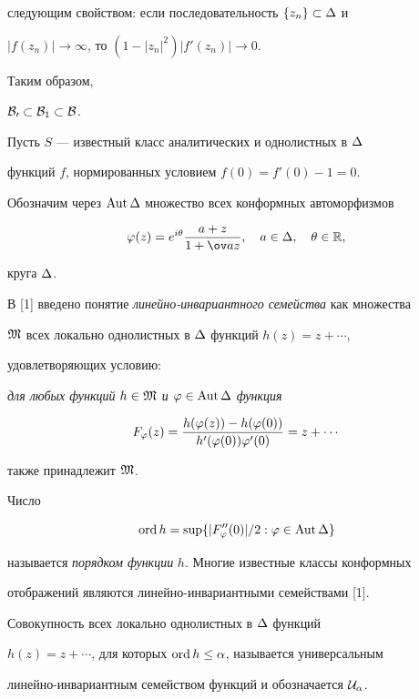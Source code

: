 следующим свойством: если последовательность $\{z_n\}\subset\Delta$ и


$|f(z_n)|\to\infty$, то $(1-|z_n|^2)|f'(z_n)|\to 0$.


Таким образом,


${\cal B_0}\subset{\cal B}_1\subset{\cal B}$.





Пусть $S$ --- известный класс аналитических и однолистных в $\Delta$


функций $f$, нормированных условием $f(0)=f'(0)-1=0$.


Обозначим через $\operatorname{Aut} \Delta$ множество всех конформных автоморфизмов


$$


\p(z)=e^{i\theta}\frac{a+z}{1+\ov az}, \quad a\in\De, \quad


\theta\in\Bbb R,


$$


круга $\Delta$.


В [1] введено понятие {\it линейно-инвариантного семейства} как множества


$\frak M$ всех локально однолистных в $\Delta$ функций $h(z)=z+\dotsb$,


удовлетворяющих условию:


{\it для любых функций $h\in\frak M$ и $\varphi\in \operatorname{Aut} \Delta$ функция


$$


F_\p (z)=\frac{h(\p (z))-h(\p (0))}{h'(\p (0))\p '(0)}


=z+\dotsb


$$


также принадлежит $\frak M$.}





Число


$$


\ord h =\sup\{{|F''_\p (0)|}/2 : \p\in \Aut \De\}


$$


называется {\it порядком функции} $h$. Многие известные классы конформных


отображений являются линейно-инвариантными семействами [1].





Совокупность всех локально однолистных в $\Delta$ функций


$h(z)=z+\dotsb$, для которых $\operatorname{ord} h\leq\alpha$, называется универсальным


линейно-инвариантным семейством функций и обозначается $\cal U_\alpha$.


